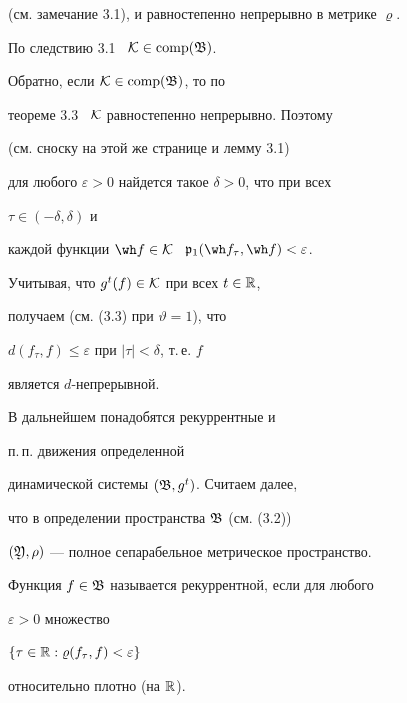 \begin{pf}
(см. замечание 3.1), и равностепенно непрерывно в метрике $\varrho$. 


По следствию 3.1 \ $\cal K\in\operatorname{comp}(\frak B)$.





Обратно, если $\cal K\in\operatorname{comp}(\frak B)$, то по 


теореме 3.3 \ $\cal K$ равностепенно непрерывно. Поэтому 


(см. сноску на этой же странице и лемму 3.1)




для любого $\varepsilon>0$ найдется такое $\delta>0$, что при всех


$\tau\in(-\delta,\delta)$ и


каждой функции $\wh f\in\cal K$ \ $\frak p_1(\wh f_{\tau},\wh f)<\varepsilon$.


Учитывая, что $g^t(f)\in\cal K$ при всех $t\in\Bbb R$,


получаем (см. (3.3) при $\vartheta=1$), что


$d(f_{\tau},f)\le\varepsilon$ при $|\tau|<\delta$, т.\,е. $f$


является $d$-непрерывной.


\end{pf}


\setcounter{footnote}{0}





В дальнейшем понадобятся рекуррентные и


п.\,п. движения определенной


динамической системы $(\frak B,g^t)$. Считаем далее,


что в определении пространства $\frak B$ (см. (3.2))


$(\frak Y,\rho)$ --- полное сепарабельное метрическое пространство.








\begin{defns}


Функция $f\in\frak B$ называется рекуррентной, если для любого


$\varepsilon>0$ множество


$\{\tau\in\Bbb R:\varrho(f_{\tau},f)<\varepsilon\}$


относительно плотно (на $\Bbb R$).


\end{defns}





